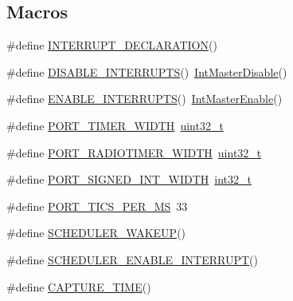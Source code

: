 \subsection*{Macros}
\begin{DoxyCompactItemize}
\item 
\#define \hyperlink{_open_mote-_c_c2538_2board__info_8h_aafcaa3cb5de374b74117d66a78e6589b}{I\+N\+T\+E\+R\+R\+U\+P\+T\+\_\+\+D\+E\+C\+L\+A\+R\+A\+T\+I\+ON}()
\item 
\#define \hyperlink{_open_mote-_c_c2538_2board__info_8h_ac136489c5ba4794566532004267967f8}{D\+I\+S\+A\+B\+L\+E\+\_\+\+I\+N\+T\+E\+R\+R\+U\+P\+TS}()~\hyperlink{group__interrupt__api_gae3724c6b65b8461cf0441f09b13fadf5}{Int\+Master\+Disable}()
\item 
\#define \hyperlink{_open_mote-_c_c2538_2board__info_8h_a7ca2cec1256c982e354114e155314354}{E\+N\+A\+B\+L\+E\+\_\+\+I\+N\+T\+E\+R\+R\+U\+P\+TS}()~\hyperlink{interrupt_8h_a8321cf21088e200350d36827ecc6dad3}{Int\+Master\+Enable}()
\item 
\#define \hyperlink{_open_mote-_c_c2538_2board__info_8h_abe66b9c1c60db84f2a99f2b827275f24}{P\+O\+R\+T\+\_\+\+T\+I\+M\+E\+R\+\_\+\+W\+I\+D\+TH}~\hyperlink{_p_e___types_8h_a33594304e786b158f3fb30289278f5af}{uint32\+\_\+t}
\item 
\#define \hyperlink{_open_mote-_c_c2538_2board__info_8h_ac16e02aadd749b2d27638bed1a805a59}{P\+O\+R\+T\+\_\+\+R\+A\+D\+I\+O\+T\+I\+M\+E\+R\+\_\+\+W\+I\+D\+TH}~\hyperlink{_p_e___types_8h_a33594304e786b158f3fb30289278f5af}{uint32\+\_\+t}
\item 
\#define \hyperlink{_open_mote-_c_c2538_2board__info_8h_a07a9f9de95908017f808cbf0c474828e}{P\+O\+R\+T\+\_\+\+S\+I\+G\+N\+E\+D\+\_\+\+I\+N\+T\+\_\+\+W\+I\+D\+TH}~\hyperlink{_p_e___types_8h_adb828ef50c2dbb783109824e94cf6c47}{int32\+\_\+t}
\item 
\#define \hyperlink{_open_mote-_c_c2538_2board__info_8h_a71ac4f01b5932487c50c4f1a4b821a92}{P\+O\+R\+T\+\_\+\+T\+I\+C\+S\+\_\+\+P\+E\+R\+\_\+\+MS}~33
\item 
\#define \hyperlink{_open_mote-_c_c2538_2board__info_8h_aef89d4774415ded995ca6326a257c4c2}{S\+C\+H\+E\+D\+U\+L\+E\+R\+\_\+\+W\+A\+K\+E\+UP}()
\item 
\#define \hyperlink{_open_mote-_c_c2538_2board__info_8h_ae298a96b817c7ab08d0dd2709763bc58}{S\+C\+H\+E\+D\+U\+L\+E\+R\+\_\+\+E\+N\+A\+B\+L\+E\+\_\+\+I\+N\+T\+E\+R\+R\+U\+PT}()
\item 
\#define \hyperlink{_open_mote-_c_c2538_2board__info_8h_a5083015b737a8da9386ae7544e239ebb}{C\+A\+P\+T\+U\+R\+E\+\_\+\+T\+I\+ME}()

\end{DoxyCompactItemize}
